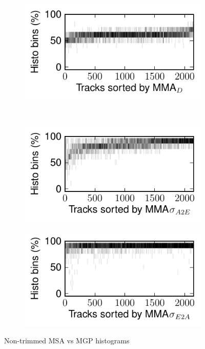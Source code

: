 \documentclass{article}
\begin{document}
\begin{figure}
      \begin{subfigure}[b]{0.25\textwidth}
              \includegraphics[width=\textwidth]{plots/histo-D.pdf}
              \caption{}
              \label{fig:histo-D}
      \end{subfigure}%
      ~ 
      \begin{subfigure}[b]{0.25\textwidth}
              \includegraphics[width=\textwidth]{plots/histo-DevA2E.pdf}
              \caption{}
              \label{fig:histo-DevA2E}
      \end{subfigure}%
       
      \begin{subfigure}[b]{0.25\textwidth}
              \includegraphics[width=\textwidth]{plots/histo-DevE2A.pdf}
              \caption{}
              \label{fig:histo-DevE2A}
      \end{subfigure}%

      \caption{Non-trimmed MSA vs MGP histograms}\label{fig:machine-eval}
\end{figure}
\end{document}
